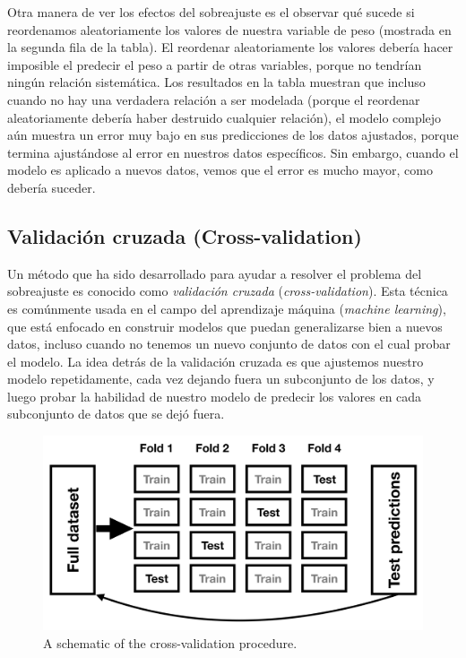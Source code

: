 \documentclass[
  12pt,
]{book}
\begin{document}
Otra manera de ver los efectos del sobreajuste es el observar qué sucede si reordenamos aleatoriamente los valores de nuestra variable de peso (mostrada en la segunda fila de la tabla). El reordenar aleatoriamente los valores debería hacer imposible el predecir el peso a partir de otras variables, porque no tendrían ningún relación sistemática. Los resultados en la tabla muestran que incluso cuando no hay una verdadera relación a ser modelada (porque el reordenar aleatoriamente debería haber destruido cualquier relación), el modelo complejo aún muestra un error muy bajo en sus predicciones de los datos ajustados, porque termina ajustándose al error en nuestros datos específicos. Sin embargo, cuando el modelo es aplicado a nuevos datos, vemos que el error es mucho mayor, como debería suceder.

\hypertarget{cross-validation}{%
\subsection{Validación cruzada (Cross-validation)}\label{cross-validation}}

Un método que ha sido desarrollado para ayudar a resolver el problema del sobreajuste es conocido como \emph{validación cruzada} (\emph{cross-validation}). Esta técnica es comúnmente usada en el campo del aprendizaje máquina (\emph{machine learning}), que está enfocado en construir modelos que puedan generalizarse bien a nuevos datos, incluso cuando no tenemos un nuevo conjunto de datos con el cual probar el modelo. La idea detrás de la validación cruzada es que ajustemos nuestro modelo repetidamente, cada vez dejando fuera un subconjunto de los datos, y luego probar la habilidad de nuestro modelo de predecir los valores en cada subconjunto de datos que se dejó fuera.

\begin{figure}
\includegraphics[width=45.74in,height=0.3\textheight]{images/crossvalidation} \caption{A schematic of the  cross-validation procedure.}\label{fig:crossvalidation}
\end{figure}
\end{document}
